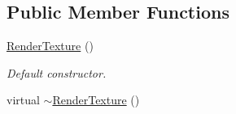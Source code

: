 \subsection*{Public Member Functions}
\begin{DoxyCompactItemize}
\item 
\hyperlink{classsf_1_1RenderTexture_a19ee6e5b4c40ad251803389b3953a9c6}{Render\-Texture} ()
\begin{DoxyCompactList}\small\item\em Default constructor. \end{DoxyCompactList}\item 
\hypertarget{classsf_1_1RenderTexture_a94b84ab9335be84d2a014c964d973304}{virtual \hyperlink{classsf_1_1RenderTexture_a94b84ab9335be84d2a014c964d973304}{$\sim$\-Render\-Texture} ()}\label{classsf_1_1RenderTexture_a94b84ab9335be84d2a014c964d973304}


\end{DoxyCompactItemize}
